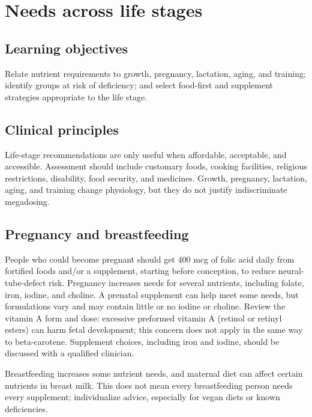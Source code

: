 \chapter{Needs across life stages}

\section{Learning objectives}
Relate nutrient requirements to growth, pregnancy, lactation, aging, and training; identify groups at risk of deficiency; and select food-first and supplement strategies appropriate to the life stage.

\section{Clinical principles}
Life-stage recommendations are only useful when affordable, acceptable, and accessible. Assessment should include customary foods, cooking facilities, religious restrictions, disability, food security, and medicines. Growth, pregnancy, lactation, aging, and training change physiology, but they do not justify indiscriminate megadosing.

\section{Pregnancy and breastfeeding}
People who could become pregnant should get 400 mcg of folic acid daily from fortified foods and/or a supplement, starting before conception, to reduce neural-tube-defect risk. Pregnancy increases needs for several nutrients, including folate, iron, iodine, and choline. A prenatal supplement can help meet some needs, but formulations vary and may contain little or no iodine or choline. Review the vitamin A form and dose: excessive preformed vitamin A (retinol or retinyl esters) can harm fetal development; this concern does not apply in the same way to beta-carotene. Supplement choices, including iron and iodine, should be discussed with a qualified clinician. \cite{cdcFolicAcid,odsPregnancy}

Breastfeeding increases some nutrient needs, and maternal diet can affect certain nutrients in breast milk. This does not mean every breastfeeding person needs every supplement; individualize advice, especially for vegan diets or known deficiencies. \cite{cdcMaternalDiet}

